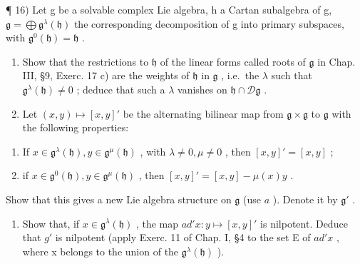 ¶ 16) Let g be a solvable complex Lie algebra, h a Cartan subalgebra of g, \(\mathfrak{g} = \bigoplus \mathfrak{g}^{\lambda}(\mathfrak{h})\) the corresponding decomposition of g into primary subspaces, with \(\mathfrak{g}^{0}(\mathfrak{h}) = \mathfrak{h}\) .

\begin{enumerate}
\def\labelenumi{\alph{enumi})}
\item
  Show that the restrictions to \(\mathfrak{h}\) of the linear forms called roots of \(\mathfrak{g}\) in Chap. III, §9, Exerc. 17 c) are the weights of \(\mathfrak{h}\) in \(\mathfrak{g}\) , i.e.~the \(\lambda\) such that \(\mathfrak{g}^{\lambda}(\mathfrak{h}) \neq 0\) ; deduce that such a \(\lambda\) vanishes on \(\mathfrak{h} \cap \mathcal{D}\mathfrak{g}\) .
\item
  Let \((x,y)\mapsto [x,y]'\) be the alternating bilinear map from \(\mathfrak{g}\times \mathfrak{g}\) to \(\mathfrak{g}\) with the following properties:
\end{enumerate}

\begin{enumerate}
\def\labelenumi{(\roman{enumi})}
\item
  If \(x \in \mathfrak{g}^{\lambda}(\mathfrak{h}), y \in \mathfrak{g}^{\mu}(\mathfrak{h})\) , with \(\lambda \neq 0, \mu \neq 0\) , then \([x, y]' = [x, y]\) ;
\item
  if \(x \in \mathfrak{g}^{0}(\mathfrak{h}), y \in \mathfrak{g}^{\mu}(\mathfrak{h})\) , then \([x, y]' = [x, y] - \mu(x)y\) .
\end{enumerate}

Show that this gives a new Lie algebra structure on \(\mathfrak{g}\) (use \(a\) ). Denote it by \(\mathfrak{g}'\) .

\begin{enumerate}
\def\labelenumi{\alph{enumi})}
\setcounter{enumi}{2}
\tightlist
\item
  Show that, if \(x \in \mathfrak{g}^{\lambda}(\mathfrak{h})\) , the map \(ad'x : y \mapsto [x, y]'\) is nilpotent. Deduce that \(g'\) is nilpotent (apply Exerc. 11 of Chap. I, §4 to the set E of \(ad'x\) , where x belongs to the union of the \(\mathfrak{g}^{\lambda}(\mathfrak{h})\) ).
\end{enumerate}

